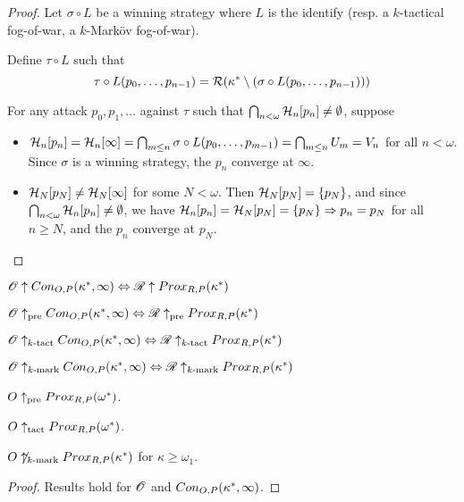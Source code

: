 \begin{proof}
  Let $\sigma\circ L$ be a winning strategy where $L$ is the identify (resp. a $k$-tactical fog-of-war, a $k$-Mark\"ov fog-of-war).

  Define $\tau\circ L$ such that
    \[
      \tau\circ L(p_0,\dots,p_{n-1})=\mathcal{R}(\kappa^*\setminus(\sigma\circ L(p_0,\dots,p_{n-1})))
    \]

  For any attack $p_0,p_1,\dots$ against $\tau$ such that $\bigcap_{n<\omega}\mathcal{H}_n[p_n]\not=\emptyset$, suppose 
    \begin{itemize}
      \item $\mathcal{H}_n[p_n]=\mathcal{H}_n[\infty]=\bigcap_{m\leq n}\sigma\circ L(p_0,\dots,p_{m-1})=\bigcap_{m\leq n}U_m=V_n$ for all $n<\omega$. Since $\sigma$ is a winning strategy, the $p_n$ converge at $\infty$.
      \item $\mathcal{H}_N[p_N]\not=\mathcal{H}_N[\infty]$ for some $N<\omega$. Then $\mathcal{H}_N[p_N]=\{p_N\}$, and since $\bigcap_{n<\omega}\mathcal{H}_n[p_n]\not=\emptyset$, we have $\mathcal{H}_n[p_n]=\mathcal{H}_N[p_N]=\{p_N\}\Rightarrow p_n=p_N$ for all $n\geq N$, and the $p_n$ converge at $p_N$.
    \end{itemize}
\end{proof}

\begin{corollary}
$\mathscr{O}\uparrow Con_{O,P}(\kappa^*,\infty) \Leftrightarrow \mathscr{R} \uparrow Prox_{R,P}(\kappa^*)$

$\mathscr{O}\uparrow_{\text{pre}} Con_{O,P}(\kappa^*,\infty) \Leftrightarrow \mathscr{R} \uparrow_{\text{pre}} Prox_{R,P}(\kappa^*)$

$\mathscr{O}\uparrow_{k\text{-tact}} Con_{O,P}(\kappa^*,\infty) \Leftrightarrow \mathscr{R} \uparrow_{k\text{-tact}} Prox_{R,P}(\kappa^*)$

$\mathscr{O}\uparrow_{k\text{-mark}} Con_{O,P}(\kappa^*,\infty) \Leftrightarrow \mathscr{R} \uparrow_{k\text{-mark}} Prox_{R,P}(\kappa^*)$
\end{corollary}

\begin{corollary}
$O\uparrow_{\text{pre}} Prox_{R,P}(\omega^*)$.

$O\uparrow_{\text{tact}}Prox_{R,P}(\omega^*)$.

$O\not\uparrow_{k\text{-mark}} Prox_{R,P}(\kappa^*)$ for $\kappa\geq\omega_1$.
\end{corollary}

\begin{proof}
Results hold for $\mathscr{O}$ and $Con_{O,P}(\kappa^*,\infty)$.
\end{proof}

